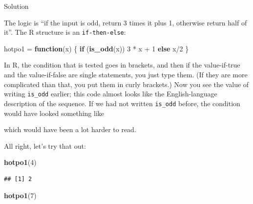 \documentclass[]{tufte-book}
\newenvironment{Shaded}{}{}
\newcommand{\ControlFlowTok}[1]{\textcolor[rgb]{0.00,0.44,0.13}{\textbf{#1}}}
\newcommand{\DecValTok}[1]{\textcolor[rgb]{0.25,0.63,0.44}{#1}}
\newcommand{\KeywordTok}[1]{\textcolor[rgb]{0.00,0.44,0.13}{\textbf{#1}}}
\newcommand{\NormalTok}[1]{#1}
\newcommand{\OperatorTok}[1]{\textcolor[rgb]{0.40,0.40,0.40}{#1}}
\newcommand{\StringTok}[1]{\textcolor[rgb]{0.25,0.44,0.63}{#1}}
\theoremstyle{definition}
\theoremstyle{definition}
\theoremstyle{definition}
\theoremstyle{remark}
\begin{document}
Solution

The logic is ``if the input is odd, return 3 times it plus 1, otherwise
return half of it''. The R structure is an \texttt{if-then-else}:

\begin{Shaded}
\begin{Highlighting}[]
\NormalTok{hotpo1 =}\StringTok{ }\ControlFlowTok{function}\NormalTok{(x) \{}
    \ControlFlowTok{if}\NormalTok{ (}\KeywordTok{is_odd}\NormalTok{(x)) }
        \DecValTok{3} \OperatorTok{*}\StringTok{ }\NormalTok{x }\OperatorTok{+}\StringTok{ }\DecValTok{1} \ControlFlowTok{else}\NormalTok{ x}\OperatorTok{/}\DecValTok{2}
\NormalTok{\}}
\end{Highlighting}
\end{Shaded}

In R, the condition that is tested goes in brackets, and then if the
value-if-true and the value-if-false are single statements, you just
type them. (If they are more complicated than that, you put them in
curly brackets.) Now you see the value of writing \texttt{is\_odd}
earlier; this code almost looks like the English-language description of
the sequence. If we had not written \texttt{is\_odd} before, the
condition would have looked something like

\begin{Shaded}
\end{Shaded}

which would have been a lot harder to read.

All right, let's try that out:

\begin{Shaded}
\begin{Highlighting}[]
\KeywordTok{hotpo1}\NormalTok{(}\DecValTok{4}\NormalTok{)}
\end{Highlighting}
\end{Shaded}

\begin{verbatim}
## [1] 2
\end{verbatim}

\begin{Shaded}
\begin{Highlighting}[]
\KeywordTok{hotpo1}\NormalTok{(}\DecValTok{7}\NormalTok{)}
\end{Highlighting}
\end{Shaded}
\end{document}
